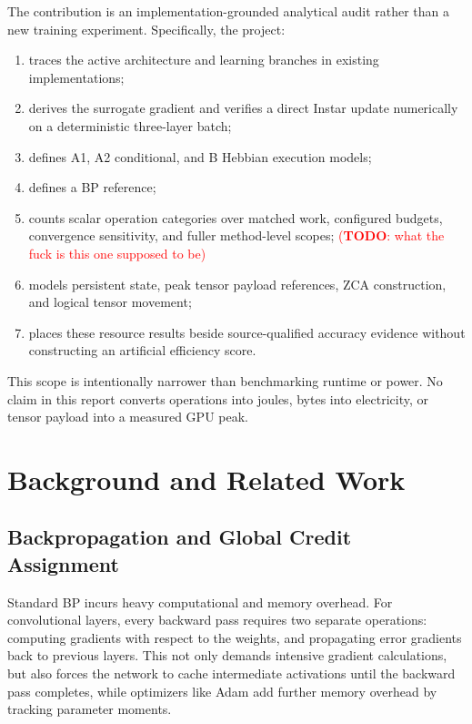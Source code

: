 \documentclass{article}
\newcommand\TODO[1]{\textcolor{red}{(\textbf{TODO}: #1)}}
\begin{document}
    The contribution is an implementation-grounded analytical audit rather than a new training experiment. Specifically, the project:
    \begin{enumerate}[noitemsep]
    \item traces the active architecture and learning branches in existing implementations;
    \item derives the surrogate gradient and verifies a direct Instar update numerically on a deterministic three-layer batch;
    \item defines A1, A2 conditional, and B Hebbian execution models;
    \item defines a BP reference;
    \item counts scalar operation categories over matched work, configured budgets, convergence sensitivity, and fuller method-level scopes; \TODO{what the fuck is this one supposed to be}
    \item models persistent state, peak tensor payload references, ZCA construction, and logical tensor movement;
    \item places these resource results beside source-qualified accuracy evidence without constructing an artificial efficiency score.
    \end{enumerate}
    
    This scope is intentionally narrower than benchmarking runtime or power. No claim in this report converts operations into joules, bytes into electricity, or tensor payload into a measured GPU peak.
    
    \section{Background and Related Work}
    
    \subsection{Backpropagation and Global Credit Assignment}
    
    Standard BP incurs heavy computational and memory overhead. For convolutional layers, every backward pass requires two separate operations: computing gradients with respect to the weights, and propagating error gradients back to previous layers. This not only demands intensive gradient calculations, but also forces the network to cache intermediate activations until the backward pass completes, while optimizers like Adam add further memory overhead by tracking parameter moments.
\end{document}
